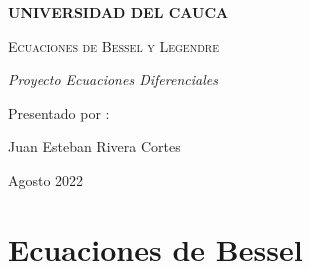 \documentclass[12pt]{report}
\begin{document}
\begin{titlepage}
\centering
{\bfseries\LARGE UNIVERSIDAD DEL CAUCA \par}
\vspace{1cm}
{\scshape\Huge Ecuaciones de Bessel y Legendre\par}
\vspace{3cm}
{\itshape\Large Proyecto Ecuaciones Diferenciales \par}
\vfill
{\Large Presentado por :\par}
{\large Juan Esteban Rivera Cortes \par}
\vfill
{\large Agosto 2022 \par}
\end{titlepage}
\tableofcontents

\chapter{Ecuaciones de Bessel}
\end{document}
